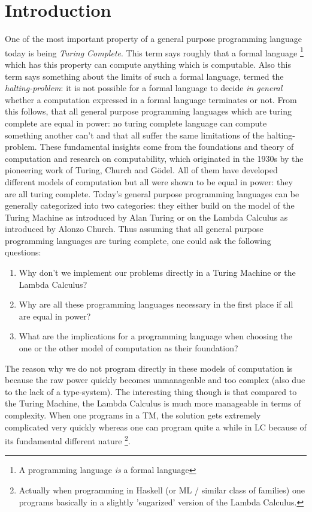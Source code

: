 \chapter{Introduction}
One of the most important property of a general purpose programming language today is being \textit{Turing Complete}. This term says roughly that a formal language \footnote{A programming language \textit{is} a formal language} which has this property can compute anything which is computable. Also this term says something about the limits of such a formal language, termed the \textit{halting-problem}: it is not possible for a formal language to decide \textit{in general} whether a computation expressed in a formal language terminates or not. From this follows, that all general purpose programming languages which are turing complete are equal in power: no turing complete language can compute something another can't and that all suffer the same limitations of the halting-problem.
These fundamental insights come from the foundations and theory of computation and research on computability, which originated in the 1930s by the pioneering work of Turing, Church and Gödel. All of them have developed different models of computation but all were shown to be equal in power: they are all turing complete.
Today's general purpose programming languages can be generally categorized into two categories: they either build on the model of the Turing Machine as introduced by Alan Turing or on the Lambda Calculus as introduced by Alonzo Church.
Thus assuming that all general purpose programming languages are turing complete, one could ask the following questions: 

\begin{enumerate}
	\item Why don't we implement our problems directly in a Turing Machine or the Lambda Calculus?
		
	\item Why are all these programming languages necessary in the first place if all are equal in power?

	\item What are the implications for a programming language when choosing the one or the other model of computation as their foundation?
\end{enumerate}

The reason why we do not program directly in these models of computation is because the raw power quickly becomes unmanageable and too complex (also due to the lack of a type-system). The interesting thing though is that compared to the Turing Machine, the Lambda Calculus is much more manageable in terms of complexity. When one programs in a TM, the solution gets extremely complicated very quickly whereas one can program quite a while in LC because of its fundamental different nature \footnote{Actually when programming in Haskell (or ML / similar class of families) one programs basically in a slightly 'sugarized' version of the Lambda Calculus.}.

